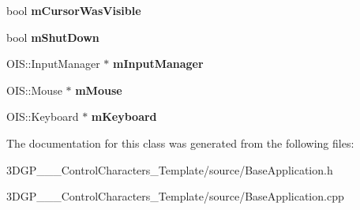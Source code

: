 \begin{DoxyCompactItemize}
bool {\bfseries m\+Cursor\+Was\+Visible}
\item 
\mbox{\label{class_base_application_a755f26d3a9915aaf830750d877e39d86}} 
bool {\bfseries m\+Shut\+Down}
\item 
\mbox{\label{class_base_application_abc9503c8462e225b5d0d55c952d9e4a9}} 
O\+I\+S\+::\+Input\+Manager $\ast$ {\bfseries m\+Input\+Manager}
\item 
\mbox{\label{class_base_application_add9b97fbe64da2814d3af113bac58c43}} 
O\+I\+S\+::\+Mouse $\ast$ {\bfseries m\+Mouse}
\item 
\mbox{\label{class_base_application_a9d6e19cf50c47379fbaae55bff28079c}} 
O\+I\+S\+::\+Keyboard $\ast$ {\bfseries m\+Keyboard}
\end{DoxyCompactItemize}


The documentation for this class was generated from the following files\+:\begin{DoxyCompactItemize}
\item 
3\+D\+G\+P\+\_\+\_\+\_\+\+Control\+Characters\+\_\+\+Template/source/Base\+Application.\+h\item 
3\+D\+G\+P\+\_\+\_\+\_\+\+Control\+Characters\+\_\+\+Template/source/Base\+Application.\+cpp\end{DoxyCompactItemize}
